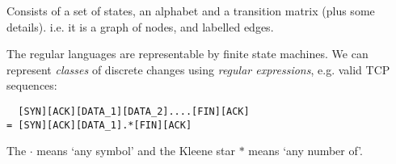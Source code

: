 \documentclass{slides}
\begin{document}

Consists of a set of states, an alphabet and a transition matrix (plus some details).
i.e. it is a graph of nodes, and labelled edges.


The regular languages are representable by finite state machines.
We can represent {\em classes} of discrete changes using {\em regular expressions},
e.g. valid TCP sequences:
\begin{verbatim}
  [SYN][ACK][DATA_1][DATA_2]....[FIN][ACK]  
= [SYN][ACK][DATA_1].*[FIN][ACK]
\end{verbatim}
The $\cdot$ means `any symbol' and the Kleene star $*$ means `any number of'.
\end{document}
